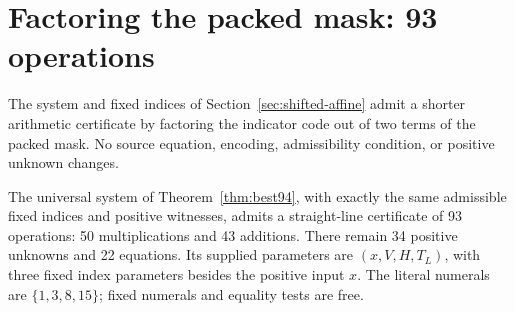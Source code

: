 \section{Factoring the packed mask: 93 operations}
\label{sec:factored-mask}

The system and fixed indices of Section~\ref{sec:shifted-affine}
admit a shorter arithmetic certificate by factoring the indicator
code out of two terms of the packed mask. No source equation,
encoding, admissibility condition, or positive unknown changes.

\begin{theorem}\label{thm:best93}
The universal system of Theorem~\ref{thm:best94}, with exactly
the same admissible fixed indices and positive witnesses, admits
a straight-line certificate of 93 operations: 50 multiplications
and 43 additions. There remain 34 positive unknowns and 22
equations. Its supplied parameters are $(x,V,H,T_L)$, with
three fixed index parameters besides the positive input $x$.
The literal numerals are $\{1,3,8,15\}$; fixed numerals and
equality tests are free.
\end{theorem}

